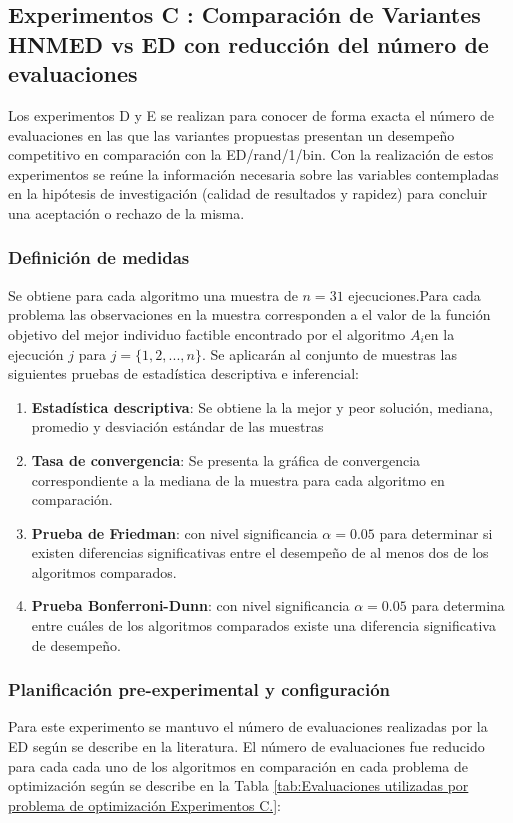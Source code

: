 




\subsection{Experimentos C : Comparación de Variantes HNMED vs ED con reducción del número de evaluaciones}
Los experimentos D y E se realizan para conocer de forma exacta el número de evaluaciones en las que las variantes propuestas presentan un desempeño competitivo en comparación con la ED/rand/1/bin. Con la realización de estos experimentos se reúne la información necesaria sobre las variables contempladas en la hipótesis de investigación (calidad de resultados y rapidez) para concluir una aceptación o rechazo de la misma.  

\subsubsection{Definición de medidas}
Se obtiene para cada algoritmo una muestra de $n=31$ ejecuciones.Para cada problema las observaciones en la muestra corresponden a el valor de la función objetivo del mejor individuo factible encontrado por el algoritmo $A_i$en la ejecución $j$ para $j= \{ 1,2,...,n\}$. Se aplicarán al conjunto de muestras las siguientes pruebas de estadística descriptiva e inferencial:
\begin{enumerate}

		\item \textbf{Estadística descriptiva}: Se obtiene la la mejor y peor solución, mediana, promedio y desviación estándar de las muestras
		\item \textbf{Tasa de convergencia}: Se presenta la gráfica de convergencia correspondiente a la mediana de la muestra para cada algoritmo en comparación.
		\item \textbf{Prueba de Friedman}: con nivel significancia $\alpha=0.05$ para determinar si existen diferencias significativas entre el desempeño de al menos dos de los algoritmos comparados. 
		\item \textbf{Prueba Bonferroni-Dunn}: con nivel significancia $\alpha=0.05$ para determina entre cuáles de los algoritmos comparados existe una diferencia significativa de desempeño.

\end{enumerate}
\subsubsection{Planificación pre-experimental y configuración}
Para este experimento se mantuvo el número de evaluaciones realizadas por la ED según se describe en la literatura. El número de evaluaciones fue reducido para cada cada uno de los algoritmos en comparación en cada problema de optimización según se describe en la Tabla \ref{tab:Evaluaciones utilizadas por problema de optimización Experimentos C.}:

